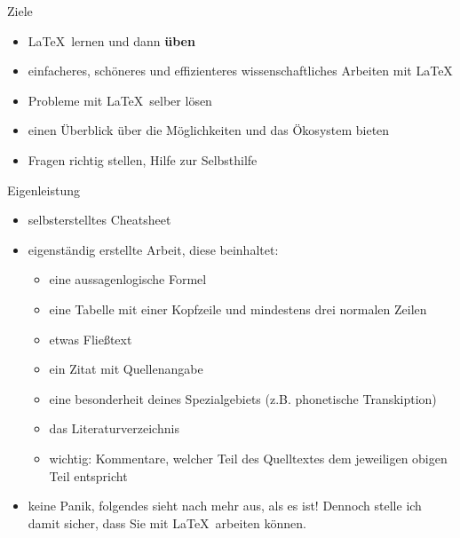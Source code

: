 \begin{frame}{Ziele}

\begin{itemize}
\itemsep1pt\parskip0pt
\item
  \LaTeX \ lernen und dann \textbf{üben}
\item
  einfacheres, schöneres und effizienteres wissenschaftliches Arbeiten
  mit \LaTeX
\item
  Probleme mit \LaTeX \ selber lösen
\item
  einen Überblick über die Möglichkeiten und das Ökosystem bieten
\item
  Fragen richtig stellen, Hilfe zur Selbsthilfe
\end{itemize}

\end{frame}

\begin{frame}{Eigenleistung}

\begin{itemize}
\itemsep1pt\parskip0pt
\item
  selbsterstelltes Cheatsheet
\item
  eigenständig erstellte Arbeit, diese beinhaltet:

  \begin{itemize}
  \itemsep1pt\parskip0pt
  \item
    eine aussagenlogische Formel
  \item
    eine Tabelle mit einer Kopfzeile und mindestens drei normalen Zeilen
  \item
    etwas Fließtext
  \item
    ein Zitat mit Quellenangabe
  \item
    eine besonderheit deines Spezialgebiets (z.B. phonetische
    Transkiption)
  \item
    das Literaturverzeichnis
  \item
    wichtig: Kommentare, welcher Teil des Quelltextes dem jeweiligen
    obigen Teil entspricht
  \end{itemize}
\item
  \scriptsize keine Panik, folgendes sieht nach mehr aus, als es ist! Dennoch stelle
  ich damit sicher, dass Sie mit \LaTeX \ arbeiten können.\normalsize
\end{itemize}

\end{frame}
